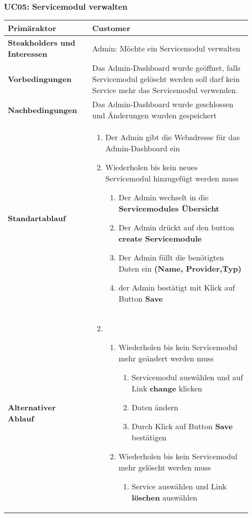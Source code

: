 \subsubsection{UC05: Servicemodul verwalten}
\begin{longtabu} to \textwidth {X[1,l] X[2,l]}
	\bfseries Primäraktor & Customer  \\\hline 
	\bfseries Steakholders und Interessen & Admin: Möchte ein Servicemodul verwalten  \\\hline 
	\bfseries Vorbedingungen & Das Admin-Dashboard wurde geöffnet, 
	falls Servicemodul gelöscht werden soll darf kein Service mehr das Servicemodul verwenden. \\\hline 
	\bfseries Nachbedingungen & Das Admin-Dashboard wurde geschlossen und 
	Änderungen wurden gespeichert \\\hline 
	\bfseries Standartablauf & 
	\begin{enumerate}
			\item Der Admin gibt die Webadresse für das Admin-Dashboard ein
			\item Wiederholen bis kein neues Servicemodul hinzugefügt werden muss
			\begin{enumerate}
			  \item Der Admin wechselt in die \textbf{Servicemodules Übersicht}
			  \item Der Admin drückt auf den button \textbf{create Servicemodule}
			  \item Der Admin füllt die benötigten Daten ein \textbf{(Name, Provider,Typ)}
			  \item der Admin bestätigt mit Klick auf Button \textbf{Save}
			\end{enumerate}
		\end{enumerate}
      \\\hline
      \bfseries Alternativer Ablauf & 
      \begin{enumerate}
        \setcounter{enumi}{1}
        \item 
        \begin{enumerate}
          \item Wiederholen bis kein Servicemodul mehr geändert werden muss
            \begin{enumerate}
              \item Servicemodul auswählen und auf Link \textbf{change} klicken
              \item Daten ändern
              \item Durch Klick auf Button \textbf{Save} bestätigen
            \end{enumerate}
            \item Wiederholen bis kein Servicemodul mehr gelöscht werden muss
            \begin{enumerate}
              \item Service auswählen und Link \textbf{löschen} auswählen
            \end{enumerate}
        \end{enumerate}
      \end{enumerate}
      \\\hline


\end{longtabu}
